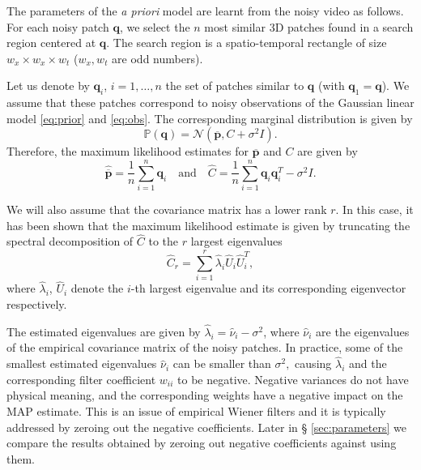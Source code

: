 \documentclass[10pt, journal, twocolumn, final, a4paper]{IEEEtran}
\newcommand{\ma}[1]{\boldsymbol{#1}}
\begin{document}
The parameters of the \textit{a priori} model are learnt from the noisy video as
follows. For each noisy patch $\ma q$, we select the $n$ most
similar 3D patches found in a search region centered at $\ma q$. The
search region is a spatio-temporal rectangle of size $w_x \times
w_x \times w_t$ ($w_x, w_t$ are odd numbers). 

Let us denote by $\ma q_i$, $i = 1, \dots, n$ the set of patches
similar to $\ma q$ (with $\ma q_1 = \ma q$). We assume that these 
patches correspond to noisy observations of the Gaussian linear model
\eqref{eq:prior} and \eqref{eq:obs}. The corresponding marginal distribution is given by
\[\mathds P(\ma q) = \mathcal N(\overline{\ma p}, C + \sigma^2I). \]
Therefore, the maximum likelihood estimates for $\overline{\ma p}$ and $C$ are given by 
\begin{equation}
	\widehat{\overline{\ma p}} = \frac1{n}\sum_{i = 1}^{n}\ma q_i \quad\text{and}\quad 
		\widehat C= \frac1n\sum_{i = 1}^{n}\ma q_i\ma q_i^T - \sigma^2I.
	\label{eq:learn_parameters}
\end{equation}

We will also assume that the covariance matrix has a lower rank $r$.  In this
case, it has been shown \cite{Tipping1999} that the maximum likelihood estimate is given by
truncating the spectral decomposition of $\widehat C$ to the $r$ largest
eigenvalues 
\begin{equation}
\widehat C_r = \sum_{i = 1}^r\widehat \lambda_i\widehat U_i\widehat U_i^T,
\end{equation}
where $\widehat \lambda_i$, $\widehat U_i$ denote the $i$-th largest
eigenvalue and its corresponding eigenvector respectively.

The estimated eigenvalues are given by $\widehat \lambda_i = \widehat
\nu_i - \sigma^2$, where $\widehat \nu_i$ are the eigenvalues of the empirical
covariance matrix of the noisy patches. In practice, some of the smallest
estimated eigenvalues $\widehat \nu_i$ can be smaller than $\sigma^2,$ causing
$\widehat \lambda_i$ and the corresponding filter coefficient $w_{ii}$ to be
negative. Negative variances do not have physical meaning, and the
corresponding weights have a negative impact on the MAP estimate. This is an
issue of empirical Wiener filters and it is typically addressed by zeroing out
the negative coefficients. Later in \S
\ref{sec:parameters} we compare the results obtained by zeroing out negative
coefficients against using them.
\end{document}
